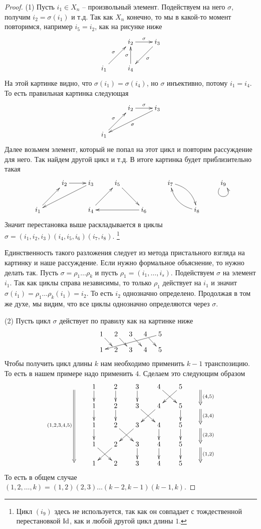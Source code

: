 \begin{proof}
(1) Пусть $i_1\in X_n$ -- произвольный элемент.
Подействуем на него $\sigma$, получим $i_2 = \sigma(i_1)$ и т.д.
Так как $X_n$ конечно, то мы в какой-то момент повторимся, например $i_5 = i_2$, как на рисунке ниже
\[
\xymatrix{
	{}&{i_2}\ar[r]^{\sigma}&{i_3}\ar[dl]^{\sigma}\\
	{i_1}\ar[ru]^{\sigma}&{i_4}\ar[u]^{\sigma}&{}\\
}
\]
На этой картинке видно, что $\sigma(i_1) = \sigma(i_4)$, но $\sigma$ инъективно, потому $i_1 = i_4$.
То есть правильная картинка следующая
\[
\xymatrix{
	{}&{i_2}\ar[r]^{\sigma}&{i_3}\ar[dll]^{\sigma}\\
	{i_1}\ar[ru]^{\sigma}&{}&{}\\
}
\]
Далее возьмем элемент, который не попал на этот цикл и повторим рассуждение для него.
Так найдем другой цикл и т.д.
В итоге картинка будет приблизительно такая
\[
\xymatrix{
	{}&{i_2}\ar[r]&{i_3}\ar[dll]&{i_5}\ar[rd]&{}&{i_7}\ar@/^10pt/[dr]&{}&{i_9}\ar@(dl,dr)\\
	{i_1}\ar[ru]&{}&{i_4}\ar[ru]&{}&{i_6}\ar[ll]&{}&{i_8}\ar@/^10pt/[ul]&{}\\
}
\]
Значит перестановка выше раскладывается в циклы $\sigma = (i_1,i_2,i_3) (i_4,i_5,i_6)(i_7,i_8)$.%
\footnote{Цикл $(i_9)$ здесь не используется, так как он совпадает с тождественной перестановкой $\operatorname{Id}$, как и любой другой цикл длины $1$.} 

Единственность такого разложения следует из метода пристального взгляда на картинку и наше рассуждение.
Если нужно формальное объяснение, то нужно делать так.
Пусть $\sigma = \rho_1\ldots \rho_k$ и пусть $\rho_1 = (i_1,\ldots,i_s)$.
Подействуем $\sigma$ на элемент $i_1$.
Так как циклы справа независимы, то только $\rho_1$ действует на $i_1$ и значит $\sigma(i_1)=\rho_1 \ldots \rho_k(i_1) = i_2$.
То есть $i_2$ однозначно определено.
Продолжая в том же духе, мы видим, что все циклы однозначно определяются через $\sigma$.


(2) Пусть цикл $\sigma$ действует по правилу как на картинке ниже
\[
\xymatrix@R=10pt@C=10pt{
  {1}\ar[dr]&{2}\ar[dr]&{3}\ar[dr]&{4}\ar[dr]&{5}\ar[dllll]\\
  {1}&{2}&{3}&{4}&{5}\\
}
\]
Чтобы получить цикл длины $k$ нам необходимо применить $k-1$ транспозицию.
То есть в нашем примере надо применить $4$.
Сделаем это следующим образом
\[
\xymatrix@R=15pt@C=20pt{
  {}\ar@{=>}_{(1,2,3,4,5)}[dddd]&{1}\ar[d]&{2}\ar[d]&{3}\ar[d]&{4}\ar[dr]&{5}\ar[dl]&{}\ar@{=>}[d]^{(4,5)}\\
  {}&{1}\ar[d]&{2}\ar[d]&{3}\ar[dr]&{4}\ar[dl]&{5}\ar[d]&{}\ar@{=>}[d]^{(3,4)}\\
  {}&{1}\ar[d]&{2}\ar[dr]&{3}\ar[dl]&{4}\ar[d]&{5}\ar[d]&{}\ar@{=>}[d]^{(2,3)}\\
  {}&{1}\ar[dr]&{2}\ar[dl]&{3}\ar[d]&{4}\ar[d]&{5}\ar[d]&{}\ar@{=>}[d]^{(1,2)}\\
  {}&{1}&{2}&{3}&{4}&{5}&{}\\
}
\]
То есть в общем случае $(1,2,\ldots,k) = (1,2)(2,3)\ldots(k-2,k-1)(k-1,k)$.

\end{proof}

